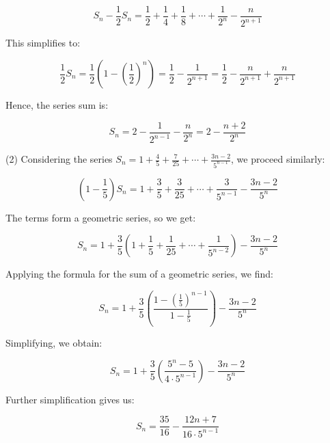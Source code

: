 \[
S_n - \frac{1}{2}S_n = \frac{1}{2} + \frac{1}{4} + \frac{1}{8} + \cdots + \frac{1}{2^n} - \frac{n}{2^{n+1}}
\]

This simplifies to:

\[
\frac{1}{2}S_n = \frac{1}{2} \left(1 - \left(\frac{1}{2}\right)^n\right) = \frac{1}{2} - \frac{1}{2^{n+1}} = \frac{1}{2} - \frac{n}{2^{n+1}} + \frac{n}{2^{n+1}}
\]

Hence, the series sum is:

\[
S_n = 2 - \frac{1}{2^{n-1}} - \frac{n}{2^n} = 2 - \frac{n+2}{2^n}
\]

(2) Considering the series \( S_n = 1 + \frac{4}{5} + \frac{7}{25} + \cdots + \frac{3n-2}{5^{n-1}} \), we proceed similarly:

\[
\left(1 - \frac{1}{5}\right)S_n = 1 + \frac{3}{5} + \frac{3}{25} + \cdots + \frac{3}{5^{n-1}} - \frac{3n-2}{5^n}
\]

The terms form a geometric series, so we get:

\[
S_n = 1 + \frac{3}{5} \left(1 + \frac{1}{5} + \frac{1}{25} + \cdots + \frac{1}{5^{n-2}}\right) - \frac{3n-2}{5^n}
\]

Applying the formula for the sum of a geometric series, we find:

\[
S_n = 1 + \frac{3}{5} \left(\frac{1 - \left(\frac{1}{5}\right)^{n-1}}{1 - \frac{1}{5}}\right) - \frac{3n-2}{5^n}
\]

Simplifying, we obtain:

\[
S_n = 1 + \frac{3}{5} \left(\frac{5^n - 5}{4 \cdot 5^{n-1}}\right) - \frac{3n-2}{5^n}
\]

Further simplification gives us:

\[
S_n = \frac{35}{16} - \frac{12n+7}{16 \cdot 5^{n-1}}
\]
